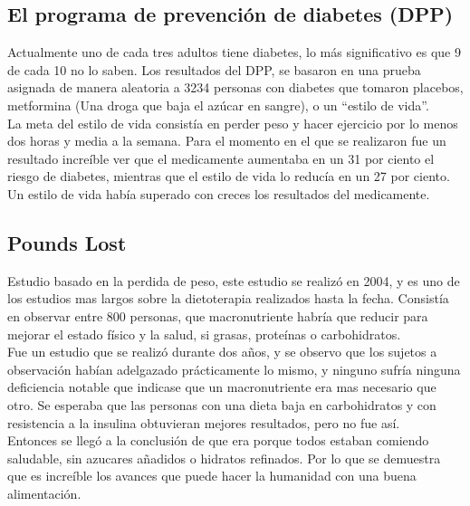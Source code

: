 \subsection{El programa de prevención de diabetes (DPP)}
Actualmente uno de cada tres adultos tiene diabetes, lo más significativo es que 9 de cada 10 no lo saben. 
Los resultados del DPP, se basaron en una prueba asignada de manera aleatoria a 3234 personas con diabetes que tomaron placebos,  metformina (Una droga que baja el azúcar en sangre), o un “estilo de vida”.\\
La meta del estilo de vida consistía en perder peso y hacer ejercicio por lo menos dos horas y media a la semana.
Para el momento en el que se realizaron fue un resultado increíble ver que el medicamente aumentaba en un 31 por ciento el riesgo de diabetes, mientras que el estilo de vida lo reducía en un 27 por ciento. Un estilo de vida había superado con creces los resultados del medicamente. \\
\subsection{Pounds Lost}
Estudio basado en la perdida de peso, este estudio se realizó en 2004, y es uno de los estudios mas largos sobre la dietoterapia realizados hasta la fecha. Consistía en observar entre 800 personas, que macronutriente habría que reducir para mejorar el estado físico y la salud, si grasas, proteínas o carbohidratos.\\
Fue un estudio que se realizó durante dos años, y se observo que los sujetos a observación habían adelgazado prácticamente lo mismo, y ninguno sufría ninguna deficiencia notable que indicase que un macronutriente era mas necesario que otro.
Se esperaba que las personas con una dieta baja en carbohidratos y con resistencia a la insulina obtuvieran mejores resultados, pero no fue así.\\
Entonces se llegó a la conclusión de que era porque todos estaban comiendo saludable, sin azucares añadidos o hidratos refinados. Por lo que se demuestra que es increíble los avances que puede hacer la humanidad con una buena alimentación.
